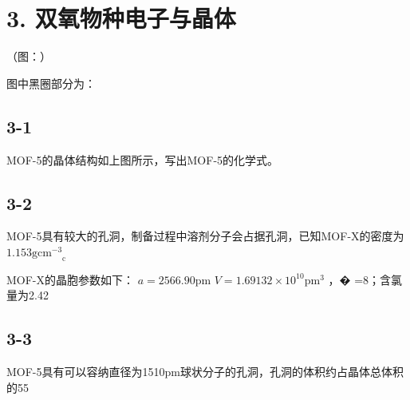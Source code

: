 \section*{3. 双氧物种电子与晶体}
（图：）

图中⿊圈部分为：

\subsection*{3-1}
MOF-5的晶体结构如上图所⽰，写出MOF-5的化学式。

\subsection*{3-2}
MOF-5具有较⼤的孔洞，制备过程中溶剂分⼦会占据孔洞，已知MOF-X的密度为 $1 . 1 5 3 \mathrm { g c m ^ { - 3 } } _ { \mathrm { c } }$

MOF-X的晶胞参数如下： $a = 2 5 6 6 . 9 0 \mathrm { p m }$ $V = 1 . 6 9 1 3 2 \times 1 0 ^ { 1 0 } \mathrm { p m } ^ { 3 }$ ，� =8；含氯量为2.42%

\subsection*{3-3}
MOF-5具有可以容纳直径为1510pm球状分⼦的孔洞，孔洞的体积约占晶体总体积的55%
